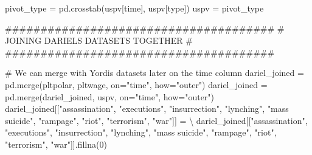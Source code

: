 \documentclass[
  letterpaper,
  DIV=11,
  numbers=noendperiod]{scrartcl}
\newenvironment{Shaded}{\begin{snugshade}}{\end{snugshade}}
\newcommand{\CommentTok}[1]{\textcolor[rgb]{0.37,0.37,0.37}{#1}}
\newcommand{\DecValTok}[1]{\textcolor[rgb]{0.68,0.00,0.00}{#1}}
\newcommand{\NormalTok}[1]{\textcolor[rgb]{0.00,0.23,0.31}{#1}}
\newcommand{\OperatorTok}[1]{\textcolor[rgb]{0.37,0.37,0.37}{#1}}
\newcommand{\StringTok}[1]{\textcolor[rgb]{0.13,0.47,0.30}{#1}}
\begin{document}
\begin{Shaded}
\begin{Highlighting}[]
\NormalTok{pivot\_type }\OperatorTok{=}\NormalTok{ pd.crosstab(uspv[}\StringTok{\textquotesingle{}time\textquotesingle{}}\NormalTok{], uspv[}\StringTok{\textquotesingle{}type\textquotesingle{}}\NormalTok{])}
\NormalTok{uspv }\OperatorTok{=}\NormalTok{ pivot\_type}

\CommentTok{\#\#\#\#\#\#\#\#\#\#\#\#\#\#\#\#\#\#\#\#\#\#\#\#\#\#\#\#\#\#\#\#\#\#\#\#\#\#}
\CommentTok{\# JOINING DARIEL\textquotesingle{}S DATASETS TOGETHER \#}
\CommentTok{\#\#\#\#\#\#\#\#\#\#\#\#\#\#\#\#\#\#\#\#\#\#\#\#\#\#\#\#\#\#\#\#\#\#\#\#\#\#}

\CommentTok{\# We can merge with Yordi\textquotesingle{}s datasets later on the time column}
\NormalTok{dariel\_joined }\OperatorTok{=}\NormalTok{ pd.merge(pltpolar, pltwage, on}\OperatorTok{=}\StringTok{"time"}\NormalTok{, how}\OperatorTok{=}\StringTok{"outer"}\NormalTok{)}
\NormalTok{dariel\_joined }\OperatorTok{=}\NormalTok{ pd.merge(dariel\_joined, uspv, on}\OperatorTok{=}\StringTok{"time"}\NormalTok{, how}\OperatorTok{=}\StringTok{"outer"}\NormalTok{)}
\NormalTok{dariel\_joined[[}\StringTok{"assassination"}\NormalTok{, }\StringTok{"executions"}\NormalTok{, }\StringTok{"insurrection"}\NormalTok{, }\StringTok{"lynching"}\NormalTok{,}
               \StringTok{"mass suicide"}\NormalTok{, }\StringTok{"rampage"}\NormalTok{, }\StringTok{"riot"}\NormalTok{, }\StringTok{"terrorism"}\NormalTok{, }\StringTok{"war"}\NormalTok{]] }\OperatorTok{=} \OperatorTok{\textbackslash{}}
\NormalTok{dariel\_joined[[}\StringTok{"assassination"}\NormalTok{, }\StringTok{"executions"}\NormalTok{, }\StringTok{"insurrection"}\NormalTok{, }\StringTok{"lynching"}\NormalTok{,}
               \StringTok{"mass suicide"}\NormalTok{, }\StringTok{"rampage"}\NormalTok{, }\StringTok{"riot"}\NormalTok{, }\StringTok{"terrorism"}\NormalTok{, }\StringTok{"war"}\NormalTok{]].fillna(}\DecValTok{0}\NormalTok{)}


\end{Highlighting}
\end{Shaded}
\end{document}
